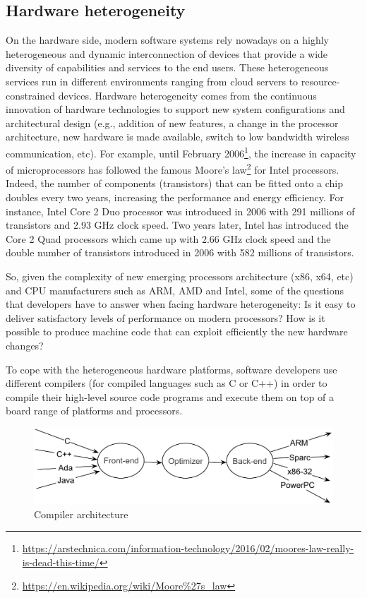 \subsection{Hardware heterogeneity}
On the hardware side, modern software systems rely nowadays on a highly heterogeneous and dynamic interconnection of devices that provide a wide diversity of capabilities and services to the end users.
These heterogeneous services run in different environments ranging from cloud servers to resource-constrained devices.
Hardware heterogeneity comes from the continuous innovation of hardware technologies to support new system configurations and architectural design (e.g., addition of new features, a change in the processor architecture, new hardware is made available, switch to low bandwidth wireless communication, etc). 
For example, until February 2006\footnote{\url{https://arstechnica.com/information-technology/2016/02/moores-law-really-is-dead-this-time/}}, the increase in capacity of microprocessors has followed the famous Moore's law\footnote{\url{https://en.wikipedia.org/wiki/Moore\%27s_law}} for Intel processors. Indeed, the number of components (transistors) that can be fitted onto a chip doubles every two years, increasing the performance and energy efficiency.
For instance, Intel Core 2 Duo processor was introduced in 2006 with 291 millions of transistors and 2.93 GHz clock speed. Two years later, Intel has introduced the Core 2 Quad processors which came up with 2.66 GHz clock speed and the double number of transistors introduced in 2006 with 582 millions of transistors.

So, given the complexity of new emerging processors architecture (x86, x64, etc) and CPU manufacturers such as ARM, AMD and Intel, some of the questions that developers have to answer when facing hardware heterogeneity: 
Is it easy to deliver satisfactory levels of performance on modern processors? How is it possible to produce machine code that can exploit efficiently the new hardware changes? 

To cope with the heterogeneous hardware platforms, software developers use different compilers (for compiled languages such as C or C++) in order to compile their high-level source code programs and execute them on top of a board range of platforms and processors. 

\begin{figure}[h]
	\center
	\includegraphics[scale=0.65]{Background/fig/compilers}
	\caption{Compiler architecture}
\end{figure}

